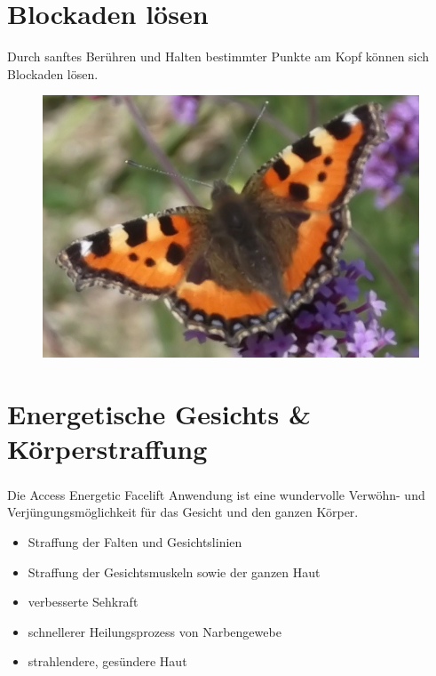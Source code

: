 \documentclass[10pt,foldmark,notumble]{leaflet}
\begin{document}
\newpage
\vspace*{10mm}

\section{Blockaden lösen}
Durch sanftes Berühren und Halten bestimmter Punkte am Kopf können sich Blockaden lösen. 



\vspace*{10mm}
\begin{figure}[h] %
\begin{center}
\includegraphics [scale=.38]{Schmetterling3.JPG}
 \end{center}
\end{figure}

\vspace*{5mm}

\section{Energetische Gesichts \& Körperstraffung}
Die Access Energetic Facelift\textsuperscript{\textregistered} Anwendung ist eine wundervolle Verwöhn- und Verjüngungsmöglichkeit für das Gesicht und den ganzen Körper.

\begin{itemize}
\item Straffung der Falten und Gesichtslinien
\item Straffung der Gesichtsmuskeln sowie der ganzen Haut
\item verbesserte Sehkraft
\item schnellerer Heilungsprozess von Narbengewebe
\item strahlendere, gesündere Haut
\end{itemize}
\end{document}
